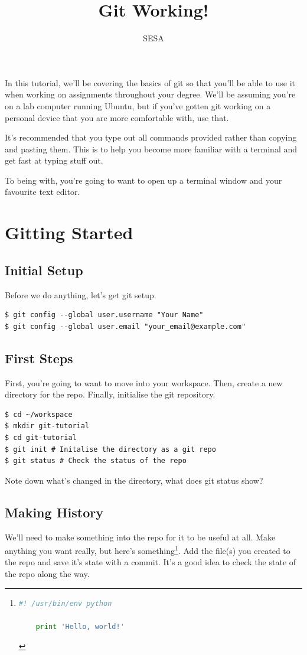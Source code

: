 \documentclass{tufte-handout}
\title{Git Working!}
\author{SESA}
\begin{document}
\maketitle

\noindent In this tutorial, we'll be covering the basics of git so that you'll be able to use it when working on assignments throughout your degree. We'll be assuming you're on a lab computer running Ubuntu, but if you've gotten git working on a personal device that you are more comfortable with, use that.

\noindent It's recommended that you type out all commands provided rather than copying and pasting them. This is to help you become more familiar with a terminal and get fast at typing stuff out.

\noindent To being with, you're going to want to open up a terminal window and your favourite text editor.

\section{Gitting Started}
\subsection{Initial Setup}

Before we do anything, let's get git setup.

\begin{lstlisting}
$ git config --global user.username "Your Name"
$ git config --global user.email "your_email@example.com"
\end{lstlisting}

\subsection{First Steps}

First, you're going to want to move into your workspace. Then, create a new directory for the repo. Finally, initialise the git repository.

\begin{lstlisting}
$ cd ~/workspace
$ mkdir git-tutorial
$ cd git-tutorial
$ git init # Initalise the directory as a git repo
$ git status # Check the status of the repo
\end{lstlisting}

\noindent Note down what's changed in the directory, what does git status show?

\subsection{Making History}
We'll need to make something into the repo for it to be useful at all. Make anything you want really, but here's something\cprotect\footnote{
	\begin{lstlisting}[language=Python]
	#! /usr/bin/env python

	print 'Hello, world!'
	\end{lstlisting}
}.
Add the file(s) you created to the repo and save it's state with a commit. It's a good idea to check the state of the repo along the way.
\end{document}
